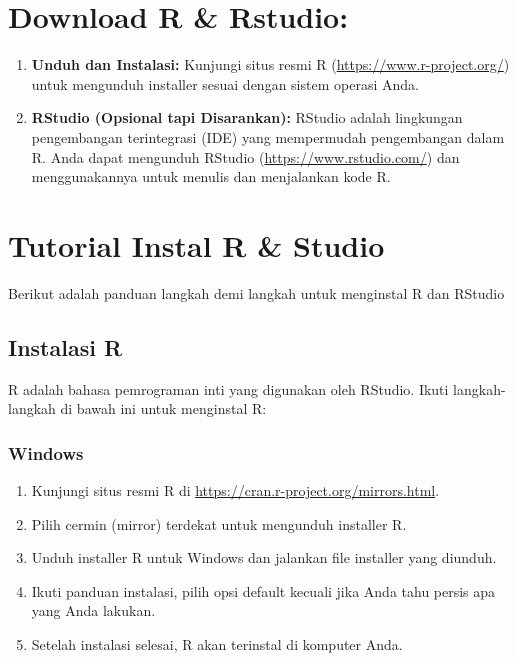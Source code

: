 \documentclass[
]{book}
\providecommand{\tightlist}{%
  \setlength{\itemsep}{0pt}\setlength{\parskip}{0pt}}
\begin{document}
\hypertarget{download-r-rstudio}{%
\section{Download R \& Rstudio:}\label{download-r-rstudio}}

\begin{enumerate}
\def\labelenumi{\arabic{enumi}.}
\tightlist
\item
  \textbf{Unduh dan Instalasi:} Kunjungi situs resmi R (\url{https://www.r-project.org/}) untuk mengunduh installer sesuai dengan sistem operasi Anda.
\item
  \textbf{RStudio (Opsional tapi Disarankan):} RStudio adalah lingkungan pengembangan terintegrasi (IDE) yang mempermudah pengembangan dalam R. Anda dapat mengunduh RStudio (\url{https://www.rstudio.com/}) dan menggunakannya untuk menulis dan menjalankan kode R.
\end{enumerate}

\hypertarget{tutorial-instal-r-studio}{%
\section{Tutorial Instal R \& Studio}\label{tutorial-instal-r-studio}}

Berikut adalah panduan langkah demi langkah untuk menginstal R dan RStudio

\hypertarget{instalasi-r}{%
\subsection{Instalasi R}\label{instalasi-r}}

R adalah bahasa pemrograman inti yang digunakan oleh RStudio. Ikuti langkah-langkah di bawah ini untuk menginstal R:

\hypertarget{windows}{%
\subsubsection*{Windows}\label{windows}}

\begin{enumerate}
\def\labelenumi{\arabic{enumi}.}
\tightlist
\item
  Kunjungi situs resmi R di \url{https://cran.r-project.org/mirrors.html}.
\item
  Pilih cermin (mirror) terdekat untuk mengunduh installer R.
\item
  Unduh installer R untuk Windows dan jalankan file installer yang diunduh.
\item
  Ikuti panduan instalasi, pilih opsi default kecuali jika Anda tahu persis apa yang Anda lakukan.
\item
  Setelah instalasi selesai, R akan terinstal di komputer Anda.
\end{enumerate}
\end{document}
